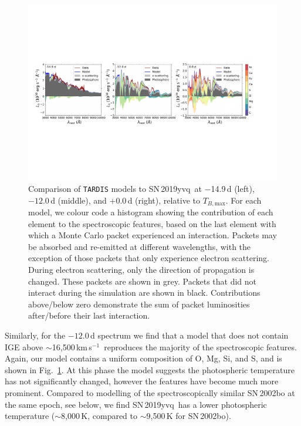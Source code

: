 \documentclass[twocolumn]{aastex63}
\newcommand{\tbmax}{$T_{B,\mathrm{max}}$}
\newcommand{\kms}{km\,s$^{-1}$}
\newcommand{\sn}{SN\,2019yvq}
\begin{document}
\begin{figure}
    \centering
    \includegraphics[width=\textwidth]{./figures/tardis.pdf}
    \caption{Comparison of \texttt{TARDIS} models to \sn\ at $-$14.9\,d
    (left), $-12.0$\,d (middle), and $+$0.0\,d (right), relative to \tbmax.
    For each model, we colour code a histogram showing the contribution of
    each element to the spectroscopic features, based on the last element with
    which a Monte Carlo packet experienced an interaction. Packets may be
    absorbed and re-emitted at different wavelengths, with the exception of
    those packets that only experience electron scattering. During electron
    scattering, only the direction of propagation is changed. These packets
    are shown in grey. Packets that did not interact during the simulation are
    shown in black. Contributions above/below zero demonstrate the sum of
    packet luminosities after/before their last interaction.}
    \label{fig:tardis}
\end{figure}

Similarly, for the $-12.0$\,d spectrum we find that a model that does not
contain IGE above $\sim$16,500\,\kms\ reproduces the majority of the
spectroscopic features. Again, our model contains a uniform composition of O,
Mg, Si, and S, and is shown in Fig.~\ref{fig:tardis}. At this phase the model
suggests the photospheric temperature has not significantly changed, however
the features have become much more prominent. Compared to modelling of the
spectroscopically similar SN\,2002bo \citep{Stehle05} at the same epoch, see
below, we find \sn\ has a lower photospheric temperature ($\sim$8,000\,K,
compared to $\sim$9,500\,K for SN\,2002bo).
\end{document}
